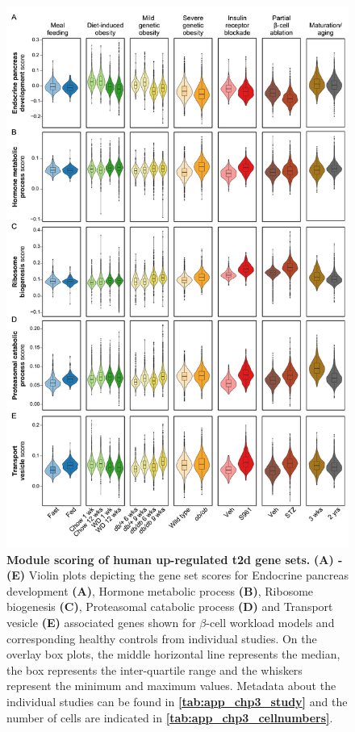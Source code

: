 \begin{figure}
  \centering
  \includegraphics[width=0.6\linewidth]{Appendix2/Fig/F3-21-01.png}
  \vspace{-120pt}
  \caption[Module scoring of human up-regulated  gene sets]{\textbf{Module scoring of human up-regulated \gls{t2d} gene sets.} \textbf{(A) - (E)} Violin plots depicting the gene set scores for Endocrine pancreas development \textbf{(A)}, Hormone metabolic process \textbf{(B)}, Ribosome biogenesis \textbf{(C)}, Proteasomal catabolic process \textbf{(D)} and Transport vesicle \textbf{(E)} associated genes shown for $\beta$-cell workload models and corresponding healthy controls from individual studies. On the overlay box plots, the middle horizontal line represents the median, the box represents the inter-quartile range and the whiskers represent the minimum and maximum values. Metadata about the individual studies can be found in \textbf{\autoref{tab:app_chp3_study}} and the number of cells are indicated in \textbf{\autoref{tab:app_chp3_cellnumbers}}.}
  \label{fig:app_chp3_humant2d}
\end{figure}

